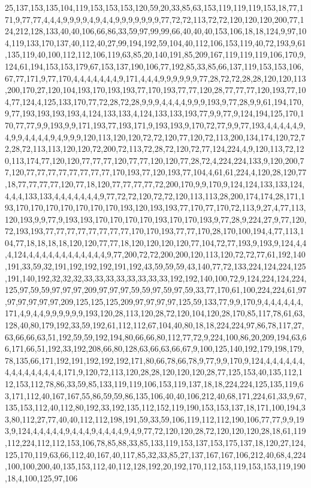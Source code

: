 25,137,153,135,104,119,153,153,153,120,59,20,33,85,63,153,119,119,119,153,18,77,171,9,77,77,4,4,4,9,9,9,9,4,9,4,4,9,9,9,9,9,9,9,77,72,72,113,72,72,120,120,120,200,77,124,212,128,133,40,40,106,66,86,33,59,97,99,99,66,40,40,40,153,106,18,18,124,9,97,104,119,133,170,137,40,112,40,27,99,194,192,59,104,40,112,106,153,119,40,72,193,9,61,135,119,40,100,112,112,106,119,63,85,20,140,191,85,209,167,119,119,119,106,170,9,124,61,194,153,153,179,67,153,137,190,106,77,192,85,33,85,66,137,119,153,153,106,67,77,171,9,77,170,4,4,4,4,4,4,4,9,171,4,4,4,9,9,9,9,9,9,77,28,72,72,28,28,120,120,113,200,170,27,120,104,193,170,193,193,77,170,193,77,77,120,28,77,77,77,120,193,77,104,77,124,4,125,133,170,77,72,28,72,28,9,9,9,4,4,4,4,9,9,9,193,9,77,28,9,9,61,194,170,9,77,193,193,193,193,4,124,133,133,4,124,133,133,193,77,9,9,77,9,124,194,125,170,170,77,77,9,9,193,9,9,171,193,77,193,171,9,193,193,9,170,72,77,9,9,77,193,4,4,4,4,4,9,4,9,9,4,4,4,4,9,4,9,9,9,120,113,120,120,72,72,120,77,120,72,113,200,134,174,120,72,72,28,72,113,113,120,120,72,200,72,113,72,28,72,120,72,77,124,224,4,9,120,113,72,120,113,174,77,120,120,77,77,77,120,77,77,120,120,77,28,72,4,224,224,133,9,120,200,77,120,77,77,77,77,77,77,77,77,170,193,77,120,193,77,104,4,61,61,224,4,120,28,120,77,18,77,77,77,77,120,77,18,120,77,77,77,77,72,200,170,9,9,170,9,124,124,133,133,124,4,4,4,133,133,4,4,4,4,4,4,4,9,77,72,72,120,72,72,120,113,113,28,200,174,174,28,171,193,170,170,170,170,170,170,170,193,120,193,193,77,170,77,170,72,113,9,27,4,77,113,120,193,9,9,77,9,193,193,170,170,170,170,193,170,170,193,9,77,28,9,224,27,9,77,120,72,193,193,77,77,77,77,77,77,77,77,170,170,193,77,77,170,28,170,100,194,4,77,113,104,77,18,18,18,18,120,120,77,77,18,120,120,120,120,77,104,72,77,193,9,193,9,124,4,4,4,124,4,4,4,4,4,4,4,4,4,4,4,4,9,77,200,72,72,200,200,120,113,120,72,72,77,61,192,140,191,33,59,32,191,192,192,192,191,192,43,59,59,59,43,140,77,72,133,224,124,224,125,191,140,192,32,32,32,33,33,33,33,33,33,33,33,192,192,140,100,72,9,124,224,124,224,125,97,59,59,97,97,97,209,97,97,97,59,59,97,59,97,59,33,77,170,61,100,224,224,61,97,97,97,97,97,97,209,125,125,125,209,97,97,97,97,125,59,133,77,9,9,170,9,4,4,4,4,4,4,171,4,9,4,4,9,9,9,9,9,9,193,120,28,113,120,28,72,120,104,120,28,170,85,117,78,61,63,128,40,80,179,192,33,59,192,61,112,112,67,104,40,80,18,18,224,224,97,86,78,117,27,63,66,66,63,51,192,59,59,192,194,80,66,66,80,112,77,72,9,224,100,86,20,209,194,63,66,171,66,51,192,33,192,208,66,80,128,63,66,63,66,67,9,100,125,140,192,179,198,179,78,135,66,171,192,191,192,192,192,171,80,66,78,66,78,9,77,9,9,170,9,124,4,4,4,4,4,4,4,4,4,4,4,4,4,4,4,171,9,120,72,113,120,28,28,120,120,120,28,77,125,153,40,135,112,112,153,112,78,86,33,59,85,133,119,119,106,153,119,137,18,18,224,224,125,135,119,63,171,112,40,167,167,55,86,59,59,86,135,106,40,40,106,212,40,68,171,224,61,33,9,67,135,153,112,40,112,80,192,33,192,135,112,152,119,190,153,153,137,18,171,100,194,33,80,112,27,77,40,40,112,112,198,191,59,33,59,106,119,112,112,190,106,77,77,9,9,193,9,124,4,4,4,4,4,9,4,4,4,9,4,4,4,4,9,4,9,77,72,120,120,28,72,120,120,120,28,18,61,119,112,224,112,112,153,106,78,85,88,33,85,133,119,153,137,153,175,137,18,120,27,124,125,170,119,63,66,112,40,167,40,117,85,32,33,85,27,137,167,167,106,212,40,68,4,224,100,100,200,40,135,153,112,40,112,128,192,20,192,170,112,153,119,153,153,119,190,18,4,100,125,97,106